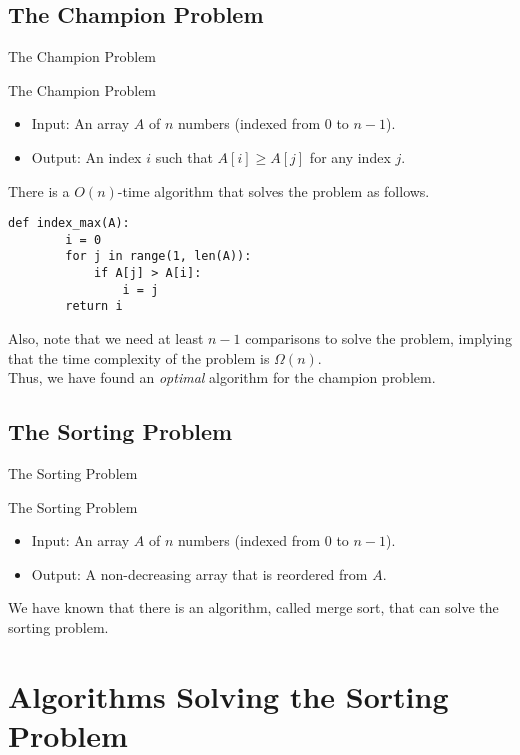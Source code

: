 \documentclass{beamer}
\begin{document}
\subsection{The Champion Problem}
\begin{frame}[fragile]{The Champion Problem}
  \begin{block}{The Champion Problem}
    \begin{itemize}
      \item Input: An array $A$ of $n$ numbers (indexed from $0$ to $n-1$).
      \item Output: An index $i$ such that $A[i] \geq A[j]$ for any index $j$.
      \pause
    \end{itemize}
  \end{block}
  There is a $O(n)$-time algorithm that solves the problem as follows. \pause
  \begin{block}{}
    \scriptsize
    \begin{lstlisting}[gobble=4]
    def index_max(A):
        i = 0
        for j in range(1, len(A)):
            if A[j] > A[i]:
                i = j
        return i
    \end{lstlisting}
    \pause
  \end{block}
  Also, note that we need at least $n-1$ comparisons to solve the problem,
  implying that the time complexity of the problem is $\Omega(n)$. \pause
  \\[.5em]
  Thus, we have found an \emph{optimal} algorithm for the champion problem.
\end{frame}

\subsection{The Sorting Problem}
\begin{frame}{The Sorting Problem}
  \begin{block}{The Sorting Problem}
    \begin{itemize}
      \item Input: An array $A$ of $n$ numbers (indexed from $0$ to $n-1$).
      \item Output: A non-decreasing array that is reordered from $A$.
      \pause
    \end{itemize}
  \end{block}
  We have known that there is an algorithm, called merge sort, that can solve
  the sorting problem.
\end{frame}

\section{Algorithms Solving the Sorting Problem}
\end{document}
